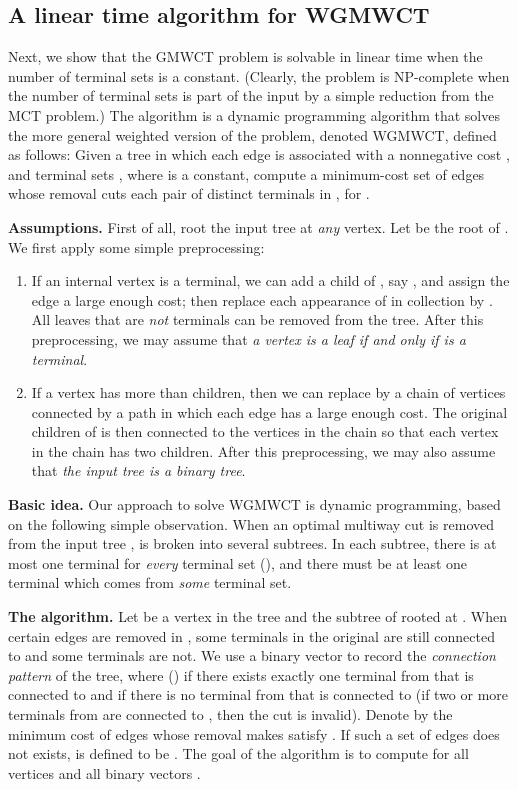 \documentclass[11pt]{article}
\begin{document}
\subsection{A linear time algorithm for WGMWCT}
\label{subsec:wgmwc}
Next, we show that the GMWCT problem is solvable in linear time when the number of terminal sets is a constant. (Clearly, the problem is NP-complete when the number of terminal sets is part of the input by a simple reduction from the MCT problem.) The algorithm is a dynamic programming algorithm that solves the more general weighted version of the problem, denoted WGMWCT, defined as follows: Given a tree  in which each edge is associated with a nonnegative cost , and terminal sets , where  is a constant, compute a minimum-cost set of edges
whose removal cuts each pair of distinct terminals in , for .

{\bf Assumptions.}
First of all, root the input tree  at {\em any} vertex.
Let  be the root of . We first apply some simple preprocessing:
\begin{enumerate}
\item If an internal vertex  is a terminal, we can add a child of , say , and assign the edge  a large enough cost; then replace each appearance of  in collection  by .
All leaves that are {\em not} terminals can be removed from the tree. After this preprocessing, we may assume that {\em a vertex  is a leaf if and
only if  is a terminal}.

\item If a vertex  has more than  children, then we can replace  by a chain of  vertices connected by a path in which each edge has a large enough cost. The original children of  is then connected to the vertices in the chain so that each vertex in the chain has two children. After this preprocessing, we may also assume that {\em the input tree  is a binary
tree}.
\end{enumerate}

{\bf Basic idea.}
Our approach to solve WGMWCT is dynamic programming, based on the following
simple observation. When an optimal multiway cut is removed from the input
tree ,  is broken into several subtrees. In each subtree, there is
at most one terminal for {\em every} terminal set  (), and
there must be at least one terminal which comes from {\em some} terminal set.


{\bf The algorithm.}
Let  be a vertex in the tree  and  the subtree of  rooted at . When certain edges are removed in , some terminals in the original 
are still connected to  and some terminals are not. We use a binary vector  to record the {\em connection pattern} of the tree, where  () if there exists exactly one terminal from
 that is connected to  and  if there is no terminal from  that is connected to  (if two or more terminals from  are connected to , then the cut is invalid). Denote by  the minimum cost of edges whose removal makes  satisfy . If such a set of edges does not exists,  is defined to be . The goal of the algorithm is to compute  for all vertices  and all binary vectors .
\end{document}
